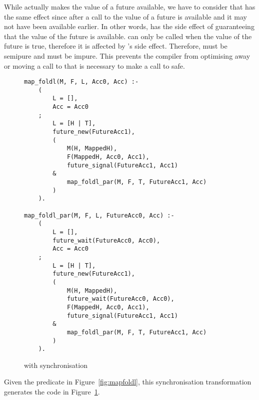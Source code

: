 While \signal actually makes the value of a future available,
we have to consider that \wait has the same effect
since after a call to \wait the value of a future is available and it
may not have been available earlier.
In other words,
\wait has the side effect of guaranteeing that the value of the future is
available.
\get can only be called when the value of the future is true,
therefore it is affected by \wait's side effect.
Therefore, \get must be semipure and \wait must be impure.
This prevents the compiler from optimising away or moving a call to \wait
that is necessary to make a call to \get safe.

\begin{figure}
\begin{verbatim}
map_foldl(M, F, L, Acc0, Acc) :-
    (
        L = [],
        Acc = Acc0
    ;
        L = [H | T],
        future_new(FutureAcc1),
        (
            M(H, MappedH),
            F(MappedH, Acc0, Acc1),
            future_signal(FutureAcc1, Acc1)
        &
            map_foldl_par(M, F, T, FutureAcc1, Acc)
        )
    ).

map_foldl_par(M, F, L, FutureAcc0, Acc) :-
    (
        L = [],
        future_wait(FutureAcc0, Acc0),
        Acc = Acc0
    ;
        L = [H | T],
        future_new(FutureAcc1),
        (
            M(H, MappedH),
            future_wait(FutureAcc0, Acc0),
            F(MappedH, Acc0, Acc1),
            future_signal(FutureAcc1, Acc1)
        &
            map_foldl_par(M, F, T, FutureAcc1, Acc)
        )
    ).
\end{verbatim}
\caption{\mapfoldl{} with synchronisation}
\label{fig:map_foldl_sync}
\end{figure}

Given the \mapfoldl predicate in Figure~\ref{fig:mapfoldl},
this synchronisation transformation
generates the code in Figure~\ref{fig:map_foldl_sync}.



